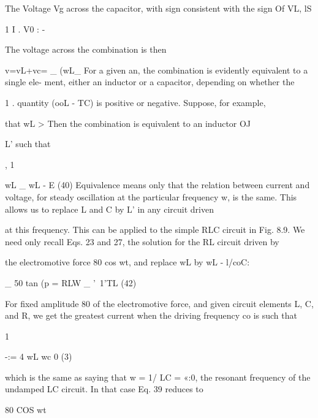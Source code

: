 The Voltage Vg across the capacitor, with sign consistent with the sign
Of VL, lS

\begin{equation}
\end{equation}
1 I .
V0 : - %

The voltage across the combination is then

\begin{equation}
\end{equation}
v=vL+vc= _ (wL_%
For a given an, the combination is evidently equivalent to a single ele-
ment, either an inductor or a capacitor, depending on whether the

1 .
quantity (ooL - TC) is positive or negative. Suppose, for example,

that wL >  Then the combination is equivalent to an inductor
OJ

L' such that

\begin{equation}
\end{equation}
, 1

wL _ wL - E (40)
Equivalence means only that the relation between current and
voltage, for steady oscillation at the particular frequency w, is the
same. This allows us to replace L and C by L' in any circuit driven

at this frequency.
This can be applied to the simple RLC circuit in Fig. 8.9. We need
only recall Eqs. 23 and 27, the solution for the RL circuit driven by

the electromotive force 80 cos wt, and replace wL by wL - l/coC:

\begin{equation}
\end{equation}
_ 50
tan (p = RLW _ '~1'TL (42)

For fixed amplitude 80 of the electromotive force, and given circuit
elements L, C, and R, we get the greatest current when the driving
frequency co is such that

\begin{equation}
\end{equation}
1

-:= 4
wL wc 0 (3)

which is the same as saying that w = 1/ LC = «:0, the resonant
frequency of the undamped LC circuit. In that case Eq. 39 reduces to

\begin{equation}
\end{equation}
80 COS wt

